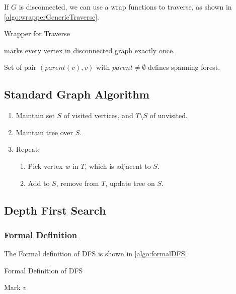 If $G$ is disconnected, we can use a wrap functions to traverse,
as shown in \cref{algo:wrapperGenericTraverse}.

\begin{algorithm}[H]
    \caption{Wrapper for Traverse}\label{algo:wrapperGenericTraverse}
    \begin{algorithmic}[1]
                    \State{}
                \EndIf
            \EndFor
        \EndProcedure
    \end{algorithmic}
\end{algorithm}

\begin{lemma}
     marks every vertex in disconnected graph exactly once.

    Set of pair $(parent(v),v)$ with $parent \neq \emptyset$ defines spanning forest.
\end{lemma}

\subsection{Standard Graph Algorithm}
\begin{enumerate}[label=Step {\arabic*}, leftmargin=0.5in]
    \item Maintain set $S$ of visited vertices, and $T \setminus S$ of unvisited.
    \item Maintain tree over $S$.
    \item Repeat:
        \begin{enumerate}
            \item Pick vertex $w$ in $T$, which is adjacent to $S$.
            \item Add to $S$, remove from $T$, update tree on $S$.
        \end{enumerate}
\end{enumerate}

\subsection{Depth First Search}
\subsubsection{Formal Definition}
The Formal definition of DFS is shown in \cref{algo:formalDFS}.
\begin{algorithm}[H]
    \caption{Formal Definition of DFS}\label{algo:formalDFS}
    \begin{algorithmic}[1]
            \State Mark $v$
                    \State{}
                \EndIf
            \EndFor
        \EndProcedure
    \end{algorithmic}
\end{algorithm}

